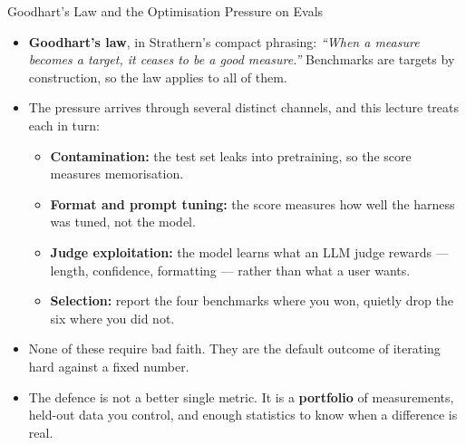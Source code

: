 \begin{frame}{Goodhart's Law and the Optimisation Pressure on Evals}
  \begin{itemize}\itemsep0.4em
    \item[\textcolor{red}{$\blacktriangleright$}] \textbf{Goodhart's law}, in Strathern's compact phrasing: \textit{``When a measure becomes a target, it ceases to be a good measure.''} Benchmarks are targets by construction, so the law applies to all of them.
    \item[\textcolor{red}{$\blacktriangleright$}] The pressure arrives through several distinct channels, and this lecture treats each in turn:
      \begin{itemize}\footnotesize\itemsep0.2em
        \item \textbf{Contamination:} the test set leaks into pretraining, so the score measures memorisation.
        \item \textbf{Format and prompt tuning:} the score measures how well the harness was tuned, not the model.
        \item \textbf{Judge exploitation:} the model learns what an LLM judge rewards --- length, confidence, formatting --- rather than what a user wants.
        \item \textbf{Selection:} report the four benchmarks where you won, quietly drop the six where you did not.
      \end{itemize}
    \item[\textcolor{red}{$\blacktriangleright$}] None of these require bad faith. They are the default outcome of iterating hard against a fixed number.
    \item[\textcolor{red}{$\blacktriangleright$}] The defence is not a better single metric. It is a \textbf{portfolio} of measurements, held-out data you control, and enough statistics to know when a difference is real.
  \end{itemize}
\end{frame}
